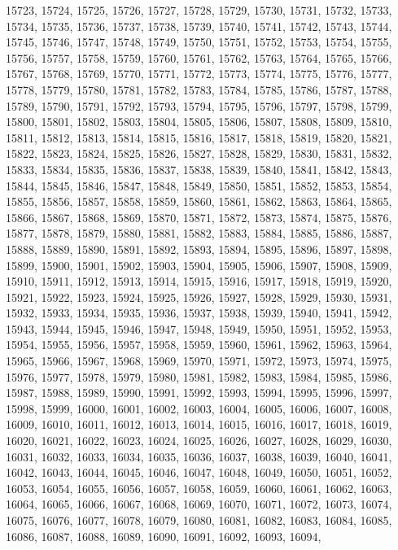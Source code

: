15723,
15724,
15725,
15726,
15727,
15728,
15729,
15730,
15731,
15732,
15733,
15734,
15735,
15736,
15737,
15738,
15739,
15740,
15741,
15742,
15743,
15744,
15745,
15746,
15747,
15748,
15749,
15750,
15751,
15752,
15753,
15754,
15755,
15756,
15757,
15758,
15759,
15760,
15761,
15762,
15763,
15764,
15765,
15766,
15767,
15768,
15769,
15770,
15771,
15772,
15773,
15774,
15775,
15776,
15777,
15778,
15779,
15780,
15781,
15782,
15783,
15784,
15785,
15786,
15787,
15788,
15789,
15790,
15791,
15792,
15793,
15794,
15795,
15796,
15797,
15798,
15799,
15800,
15801,
15802,
15803,
15804,
15805,
15806,
15807,
15808,
15809,
15810,
15811,
15812,
15813,
15814,
15815,
15816,
15817,
15818,
15819,
15820,
15821,
15822,
15823,
15824,
15825,
15826,
15827,
15828,
15829,
15830,
15831,
15832,
15833,
15834,
15835,
15836,
15837,
15838,
15839,
15840,
15841,
15842,
15843,
15844,
15845,
15846,
15847,
15848,
15849,
15850,
15851,
15852,
15853,
15854,
15855,
15856,
15857,
15858,
15859,
15860,
15861,
15862,
15863,
15864,
15865,
15866,
15867,
15868,
15869,
15870,
15871,
15872,
15873,
15874,
15875,
15876,
15877,
15878,
15879,
15880,
15881,
15882,
15883,
15884,
15885,
15886,
15887,
15888,
15889,
15890,
15891,
15892,
15893,
15894,
15895,
15896,
15897,
15898,
15899,
15900,
15901,
15902,
15903,
15904,
15905,
15906,
15907,
15908,
15909,
15910,
15911,
15912,
15913,
15914,
15915,
15916,
15917,
15918,
15919,
15920,
15921,
15922,
15923,
15924,
15925,
15926,
15927,
15928,
15929,
15930,
15931,
15932,
15933,
15934,
15935,
15936,
15937,
15938,
15939,
15940,
15941,
15942,
15943,
15944,
15945,
15946,
15947,
15948,
15949,
15950,
15951,
15952,
15953,
15954,
15955,
15956,
15957,
15958,
15959,
15960,
15961,
15962,
15963,
15964,
15965,
15966,
15967,
15968,
15969,
15970,
15971,
15972,
15973,
15974,
15975,
15976,
15977,
15978,
15979,
15980,
15981,
15982,
15983,
15984,
15985,
15986,
15987,
15988,
15989,
15990,
15991,
15992,
15993,
15994,
15995,
15996,
15997,
15998,
15999,
16000,
16001,
16002,
16003,
16004,
16005,
16006,
16007,
16008,
16009,
16010,
16011,
16012,
16013,
16014,
16015,
16016,
16017,
16018,
16019,
16020,
16021,
16022,
16023,
16024,
16025,
16026,
16027,
16028,
16029,
16030,
16031,
16032,
16033,
16034,
16035,
16036,
16037,
16038,
16039,
16040,
16041,
16042,
16043,
16044,
16045,
16046,
16047,
16048,
16049,
16050,
16051,
16052,
16053,
16054,
16055,
16056,
16057,
16058,
16059,
16060,
16061,
16062,
16063,
16064,
16065,
16066,
16067,
16068,
16069,
16070,
16071,
16072,
16073,
16074,
16075,
16076,
16077,
16078,
16079,
16080,
16081,
16082,
16083,
16084,
16085,
16086,
16087,
16088,
16089,
16090,
16091,
16092,
16093,
16094,
